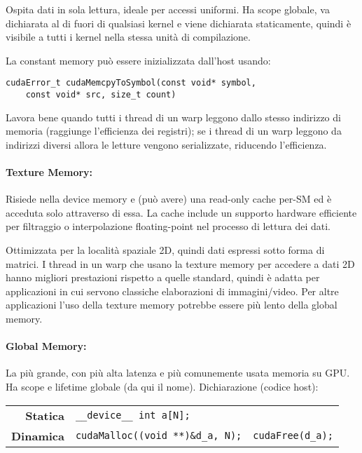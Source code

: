 Ospita dati in sola lettura, ideale per accessi uniformi. Ha scope globale, va dichiarata al di fuori di qualsiasi kernel e viene dichiarata staticamente, quindi è visibile a tutti i kernel nella stessa unità di compilazione.

La constant memory può essere inizializzata dall'host usando:
\begin{lstlisting}
cudaError_t cudaMemcpyToSymbol(const void* symbol,
    const void* src, size_t count)
\end{lstlisting}

Lavora bene quando tutti i thread di un warp leggono dallo stesso indirizzo di memoria (raggiunge l'efficienza dei registri); se i thread di un warp leggono da indirizzi diversi allora le letture vengono serializzate, riducendo l'efficienza.

\paragraph{Texture Memory:} Risiede nella device memory e (può avere) una read-only cache per-SM ed è acceduta solo attraverso di essa. La cache include un supporto hardware efficiente per filtraggio o interpolazione floating-point nel processo di lettura dei dati. 

Ottimizzata per la località spaziale 2D, quindi dati espressi sotto forma di matrici. I thread in un warp che usano la texture memory per accedere a dati 2D hanno migliori prestazioni rispetto a quelle standard, quindi è adatta per applicazioni in cui servono classiche elaborazioni di immagini/video. Per altre applicazioni l’uso della texture memory potrebbe essere più lento della global memory.

\paragraph{Global Memory:} La più grande, con più alta latenza e più comunemente usata memoria su GPU. Ha scope e lifetime globale (da qui il nome). Dichiarazione (codice host):
\begin{center}
	\begin{tabular}{r | l r | }
		\cline{2-3}
		\textbf{Statica} & \texttt{\_\_device\_\_ int a[N];} & \\
		\textbf{Dinamica} & \texttt{cudaMalloc((void **)\&d\_a, N);} & \texttt{cudaFree(d\_a);} \\
		\cline{2-3}
	\end{tabular}
\end{center}

